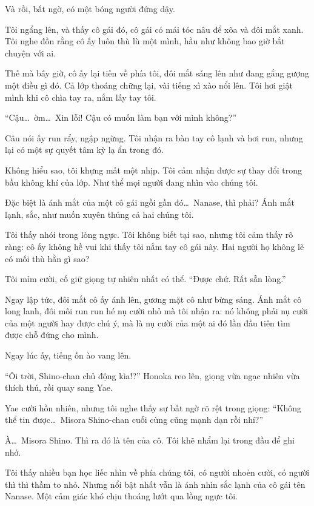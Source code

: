 \documentclass[../main.tex]{subfiles}
\begin{document}
Và rồi, bất ngờ, có một bóng người đứng dậy.

Tôi ngẩng lên, và thấy cô gái đó, cô gái có mái tóc nâu để xõa và đôi mắt xanh. Tôi nghe đồn rằng cô ấy luôn thù lù một mình, hầu như không bao giờ bắt chuyện với ai.

Thế mà bây giờ, cô ấy lại tiến về phía tôi, đôi mắt sáng lên như đang gắng gượng một điều gì đó. Cả lớp thoáng chững lại, vài tiếng xì xào nổi lên. Tôi hơi giật mình khi cô chìa tay ra, nắm lấy tay tôi.

``Cậu\dots\ ờm\dots\ Xin lỗi! Cậu có muốn làm bạn với mình không?''

Câu nói ấy run rẩy, ngập ngừng. Tôi nhận ra bàn tay cô lạnh và hơi run, nhưng lại có một sự quyết tâm kỳ lạ ẩn trong đó.

Không hiểu sao, tôi khựng mất một nhịp. Tôi cảm nhận được sự thay đổi trong bầu không khí của lớp. Như thể mọi người đang nhìn vào chúng tôi.

Đặc biệt là ánh mắt của một cô gái ngồi gần đó\dots\ Nanase, thì phải? Ánh mắt lạnh, sắc, như muốn xuyên thủng cả hai chúng tôi.

Tôi thấy nhói trong lòng ngực. Tôi không biết tại sao, nhưng tôi cảm thấy rõ ràng: cô ấy không hề vui khi thấy tôi nắm tay cô gái này. Hai người họ không lẽ có mối thù hằn gì sao?

Tôi mỉm cười, cố giữ giọng tự nhiên nhất có thể. ``Được chứ. Rất sẵn lòng.''

Ngay lập tức, đôi mắt cô ấy ánh lên, gương mặt cô như bừng sáng. Ánh mắt cô long lanh, đôi môi run run hé nụ cười nhỏ mà tôi nhận ra: nó không phải nụ cười của một người hay được chú ý, mà là nụ cười của một ai đó lần đầu tiên tìm được chỗ đứng cho mình.

Ngay lúc ấy, tiếng ồn ào vang lên.

``Ôi trời, Shino-chan chủ động kìa!?'' Honoka reo lên, giọng vừa ngạc nhiên vừa thích thú, rồi quay sang Yae.

Yae cười hồn nhiên, nhưng tôi nghe thấy sự bất ngờ rõ rệt trong giọng: ``Không thể tin được\dots\ Misora Shino-chan cuối cùng cũng mạnh dạn rồi nhỉ?''

À\dots\ Misora Shino. Thì ra đó là tên của cô. Tôi khẽ nhẩm lại trong đầu để ghi nhớ.

Tôi thấy nhiều bạn học liếc nhìn về phía chúng tôi, có người nhoẻn cười, có người thì thì thầm to nhỏ. Nhưng nổi bật nhất vẫn là ánh nhìn sắc lạnh của cô gái tên Nanase. Một cảm giác khó chịu thoáng lướt qua lồng ngực tôi.
\end{document}
